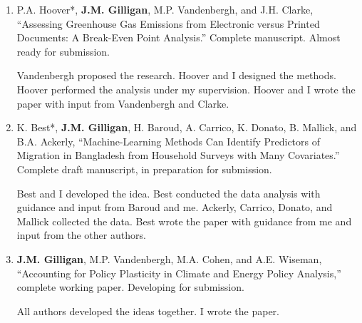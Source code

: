 %
%
\begin{enumerate}
    \item 
    P.A. Hoover*, \textbf{J.M. Gilligan}, M.P. Vandenbergh, and J.H. Clarke,
    ``Assessing Greenhouse Gas Emissions from Electronic versus Printed Documents: A Break-Even Point Analysis.''
    Complete manuscript. Almost ready for submission.
\begin{credit}
    Vandenbergh proposed the research. Hoover and I designed the methods. Hoover performed the analysis under my supervision.
    Hoover and I wrote the paper with input from Vandenbergh and Clarke.
\end{credit}
    
    \item 
    K. Best*, \textbf{J.M. Gilligan}, H. Baroud, A. Carrico, K. Donato, B. Mallick, and B.A. Ackerly,
    ``Machine-Learning Methods Can Identify Predictors of Migration in Bangladesh from Household Surveys with Many Covariates.''
    Complete draft manuscript, in preparation for submission.
\begin{credit}
    Best and I developed the idea. Best conducted the data analysis with guidance and input from Baroud and me.
    Ackerly, Carrico, Donato, and Mallick collected the data.
    Best wrote the paper with guidance from me and input from the other authors.
\end{credit}
    
    \item 
    \textbf{J.M. Gilligan}, M.P. Vandenbergh, M.A. Cohen, and A.E. Wiseman, 
    ``Accounting for Policy Plasticity in Climate and Energy Policy Analysis,''
    complete working paper.
    Developing for submission.
\begin{credit}
    All authors developed the ideas together. I wrote the paper.
\end{credit}    
\end{enumerate}
